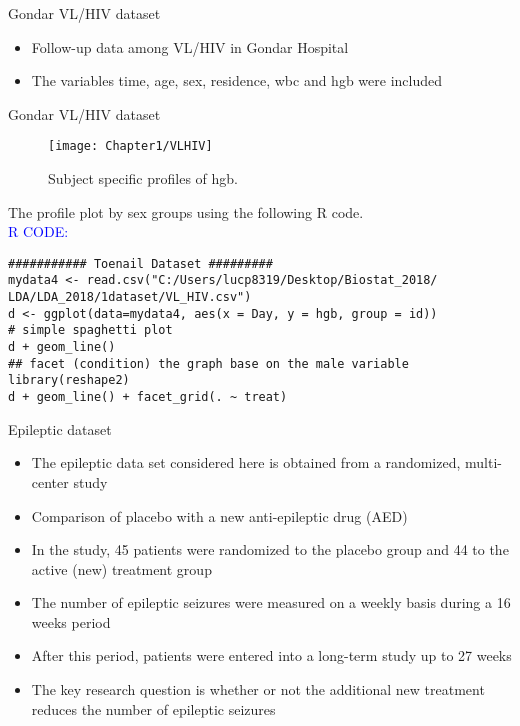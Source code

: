 \documentclass{beamer}
\begin{document}
\begin{frame}{Gondar VL/HIV dataset}
\begin{itemize}
	\item Follow-up data among VL/HIV in Gondar Hospital
	\item The variables time, age, sex, residence, wbc and hgb were included
\end{itemize}
\end{frame}

\begin{frame}{Gondar VL/HIV dataset}
\begin{figure}[h!]
	\centering
	\texttt{[image: Chapter1/VLHIV]}
	\caption{Subject specific profiles of hgb. \label{Profile2 by Outcome}}
\end{figure}
\end{frame}

\begin{frame}[fragile]
The profile plot by sex groups using the following R code. \\
\vspace{1cm}
\textcolor{blue}{R CODE:} \scriptsize\begin{verbatim}
########### Toenail Dataset #########
mydata4 <- read.csv("C:/Users/lucp8319/Desktop/Biostat_2018/
LDA/LDA_2018/1dataset/VL_HIV.csv")
d <- ggplot(data=mydata4, aes(x = Day, y = hgb, group = id))
# simple spaghetti plot
d + geom_line()
## facet (condition) the graph base on the male variable
library(reshape2)
d + geom_line() + facet_grid(. ~ treat)
\end{verbatim}
\end{frame}

\begin{frame}{Epileptic dataset}
\begin{itemize}
	\item  The epileptic data set considered here is obtained from a randomized, multi-center study
	\item Comparison of placebo with a new anti-epileptic drug (AED)
	\item In the study, 45 patients were randomized to the placebo group and 44 to the active (new) treatment group
	\item The number of epileptic seizures were measured on a weekly basis during a 16 weeks period
	\item After this period, patients were entered into a long-term study up to 27 weeks
	\item The key research question is whether or not the additional new treatment reduces the number of epileptic seizures
\end{itemize}
\end{frame}
\end{document}
